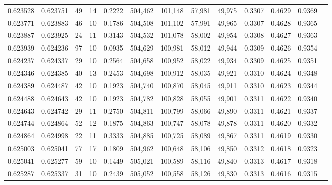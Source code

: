 \begin{tabular}{rrrrrrrrrrrrr}
0.623528 & 0.623751 &    49 &  14 &                                     0.2222 & 504,462 & 101,148 &  57,981 &  49,975 & 0.3307 & 0.4629 & 0.9369 \\
0.623771 & 0.623883 &    46 &  10 &                                     0.1786 & 504,508 & 101,102 &  57,991 &  49,965 & 0.3307 & 0.4628 & 0.9365 \\
0.623887 & 0.623925 &    24 &  11 &                                     0.3143 & 504,532 & 101,078 &  58,002 &  49,954 & 0.3308 & 0.4627 & 0.9363 \\
0.623939 & 0.624236 &    97 &  10 &                                     0.0935 & 504,629 & 100,981 &  58,012 &  49,944 & 0.3309 & 0.4626 & 0.9354 \\
0.624237 & 0.624337 &    29 &  10 &                                     0.2564 & 504,658 & 100,952 &  58,022 &  49,934 & 0.3309 & 0.4625 & 0.9351 \\
0.624346 & 0.624385 &    40 &  13 &                                     0.2453 & 504,698 & 100,912 &  58,035 &  49,921 & 0.3310 & 0.4624 & 0.9348 \\
0.624389 & 0.624487 &    42 &  10 &                                     0.1923 & 504,740 & 100,870 &  58,045 &  49,911 & 0.3310 & 0.4623 & 0.9344 \\
0.624488 & 0.624643 &    42 &  10 &                                     0.1923 & 504,782 & 100,828 &  58,055 &  49,901 & 0.3311 & 0.4622 & 0.9340 \\
0.624643 & 0.624742 &    29 &  11 &                                     0.2750 & 504,811 & 100,799 &  58,066 &  49,890 & 0.3311 & 0.4621 & 0.9337 \\
0.624744 & 0.624864 &    52 &  12 &                                     0.1875 & 504,863 & 100,747 &  58,078 &  49,878 & 0.3311 & 0.4620 & 0.9332 \\
0.624864 & 0.624998 &    22 &  11 &                                     0.3333 & 504,885 & 100,725 &  58,089 &  49,867 & 0.3311 & 0.4619 & 0.9330 \\
0.625003 & 0.625041 &    77 &  17 &                                     0.1809 & 504,962 & 100,648 &  58,106 &  49,850 & 0.3312 & 0.4618 & 0.9323 \\
0.625041 & 0.625277 &    59 &  10 &                                     0.1449 & 505,021 & 100,589 &  58,116 &  49,840 & 0.3313 & 0.4617 & 0.9318 \\
0.625287 & 0.625337 &    31 &  10 &                                     0.2439 & 505,052 & 100,558 &  58,126 &  49,830 & 0.3313 & 0.4616 & 0.9315 \\

\end{tabular}
